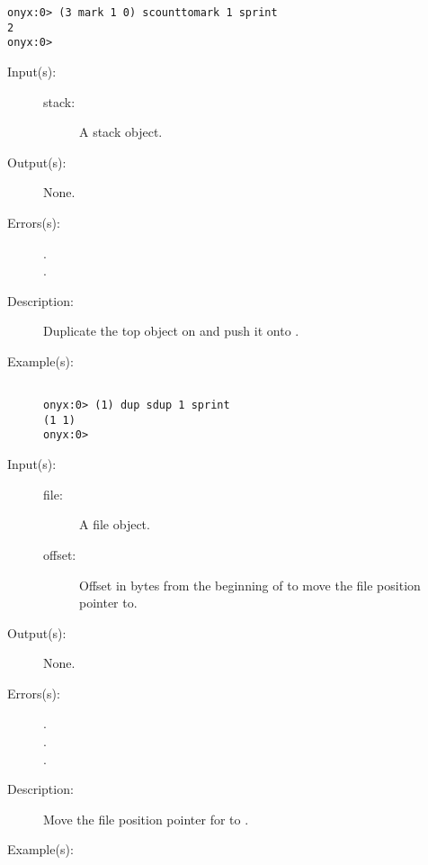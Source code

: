 \begin{description}
\begin{description}
\begin{verbatim}
onyx:0> (3 mark 1 0) scounttomark 1 sprint
2
onyx:0>
		\end{verbatim}
	\end{description}
\label{systemdict:sdup}
\item[{\onyxop{stack}{sdup}{--}}: ]
	\begin{description}\item[]
	\item[Input(s): ]
		\begin{description}\item[]
		\item[stack: ]
			A stack object.
		\end{description}
	\item[Output(s): ] None.
	\item[Errors(s): ]
		\begin{description}\item[]
		\item[.]
		\item[.]
		\end{description}
	\item[Description: ]
		Duplicate the top object on  and push it onto
		.
	\item[Example(s): ]\begin{verbatim}

onyx:0> (1) dup sdup 1 sprint
(1 1)
onyx:0>
		\end{verbatim}
	\end{description}
\label{systemdict:seek}
\item[{\onyxop{file offset}{seek}{--}}: ]
	\begin{description}\item[]
	\item[Input(s): ]
		\begin{description}\item[]
		\item[file: ]
			A file object.
		\item[offset: ]
			Offset in bytes from the beginning of 
			to move the file position pointer to.
		\end{description}
	\item[Output(s): ] None.
	\item[Errors(s): ]
		\begin{description}\item[]
		\item[.]
		\item[.]
		\item[.]
		\end{description}
	\item[Description: ]
		Move the file position pointer for  to
		.
	\item[Example(s): ]\begin{verbatim}


\end{verbatim}
\end{description}
\end{description}
